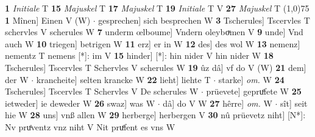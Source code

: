 \documentclass[8pt,a4paper,notitlepage]{article}
\begin{document}
\begin{table}[ht]
\begin{minipage}[t]{0.5\linewidth}
\textbf{1} \textit{Initiale} T  \textbf{15} \textit{Majuskel} T  \textbf{17} \textit{Majuskel} T  \textbf{19} \textit{Initiale} T V  \textbf{27} \textit{Majuskel} T  \newline
\line(1,0){75} \newline
\textbf{1} Mînen] Einen V (W)  $\cdot$ gesprechen] sich besprechen W \textbf{3} Tscherules] Tscervles T schervles V scherules W \textbf{7} underm œlboume] Vndern oleyboͮmen V \textbf{9} unde] Vnd auch W \textbf{10} triegen] betrigen W \textbf{11} erz] er in W \textbf{12} des] des wol W \textbf{13} nemenz] nementz T nemens [*]: im V \textbf{15} hinder] [*]: hin nider V hin nider W \textbf{18} Tscherules] Tscervles T Schervles V scherules W \textbf{19} ûz dâ] vf do V (W) \textbf{21} dem] der W  $\cdot$ krancheite] selten krancke W \textbf{22} lieht] liehte T  $\cdot$ starke] \textit{om.} W \textbf{24} Tscherules] Tscervles T Schervles V De scherules W  $\cdot$ prüevete] gepruͤfete W \textbf{25} ietweder] ie deweder W \textbf{26} swaz] was W  $\cdot$ dâ] do V W \textbf{27} hêrre] \textit{om.} W  $\cdot$ sît] seit hie W \textbf{28} uns] vnß allen W \textbf{29} herberge] herbergen V \textbf{30} nû prüevetz niht] [N*]: Nv pruͤventz vnz niht V Nit pruͤfent es vns W \newline
\end{minipage}
\end{table}
\end{document}
